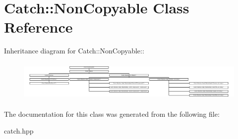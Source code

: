 \hypertarget{classCatch_1_1NonCopyable}{
\section{Catch::NonCopyable Class Reference}
\label{classCatch_1_1NonCopyable}
}
Inheritance diagram for Catch::NonCopyable::\begin{figure}[H]
\begin{center}
\leavevmode
\includegraphics[height=2.00447cm]{classCatch_1_1NonCopyable}
\end{center}
\end{figure}


The documentation for this class was generated from the following file:\begin{DoxyCompactItemize}
\item 
catch.hpp\end{DoxyCompactItemize}
